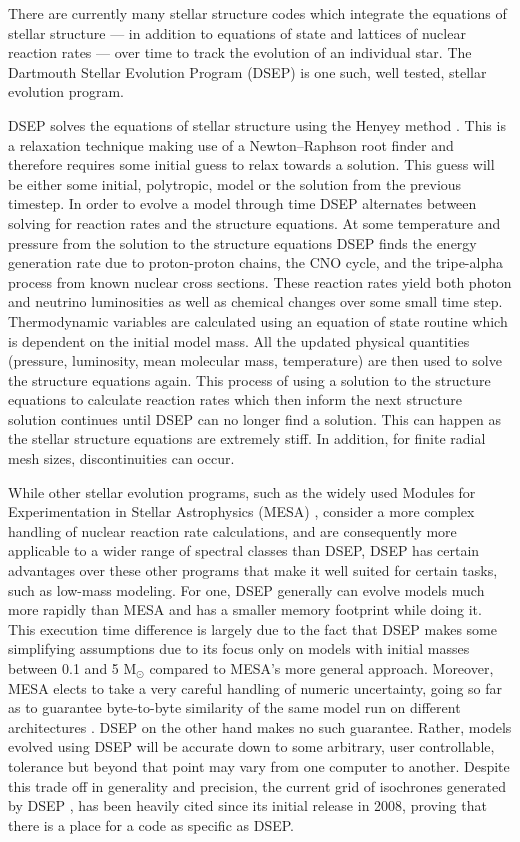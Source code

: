 There are currently many stellar structure codes \citep[e.g.][]{Dotter2008,
Kovetz2009, Paxton2011} which integrate the equations of stellar structure ---
in addition to equations of state and lattices of nuclear reaction rates ---
over time to track the evolution of an individual star. The Dartmouth Stellar
Evolution Program (DSEP) \citep{Chaboyer2001, Bjork2006, Dotter2008} is one
such, well tested, stellar evolution program.

DSEP solves the equations of stellar structure using the Henyey method
\citep{Henyey1964}. This is a relaxation technique making use of a
Newton–Raphson root finder and therefore requires some initial guess to relax
towards a solution. This guess will be either some initial, polytropic, model
or the solution from the previous timestep.  In order to evolve a model through
time DSEP alternates between solving for reaction rates and the structure
equations. At some temperature and pressure from the solution to the structure
equations DSEP finds the energy generation rate due to proton-proton chains,
the CNO cycle, and the tripe-alpha process from known nuclear cross sections.
These reaction rates yield both photon and neutrino luminosities as well as
chemical changes over some small time step. Thermodynamic variables are
calculated using an equation of state routine which is dependent on the initial
model mass. All the updated physical quantities (pressure, luminosity, mean
molecular mass, temperature) are then used to solve the structure equations
again. This process of using a solution to the structure equations to calculate
reaction rates which then inform the next structure solution continues until
DSEP can no longer find a solution.  This can happen as the stellar structure
equations are extremely stiff. In addition, for finite radial mesh sizes,
discontinuities can occur.

While other stellar evolution programs, such as the widely used Modules for
Experimentation in Stellar Astrophysics (MESA) \citep{Paxton2011}, consider a
more complex handling of nuclear reaction rate calculations, and are
consequently more applicable to a wider range of spectral classes than DSEP,
DSEP has certain advantages over these other programs that make it well suited
for certain tasks, such as low-mass modeling. For one, DSEP generally can
evolve models much more rapidly than MESA and has a smaller memory footprint
while doing it. This execution time difference is largely due to the fact that
DSEP makes some simplifying assumptions due to its focus only on models with
initial masses between 0.1 and 5 M$_{\odot}$ compared to MESA’s more general
approach.  Moreover, MESA elects to take a very careful handling of numeric
uncertainty, going so far as to guarantee byte-to-byte similarity of the same
model run on different architectures \citep{Paxton2011}. DSEP on the other hand
makes no such guarantee. Rather, models evolved using DSEP will be accurate
down to some arbitrary, user controllable, tolerance but beyond that point may
vary from one computer to another. Despite this trade off in generality and
precision, the current grid of isochrones generated by DSEP \citep{Dotter2008},
has been heavily cited since its initial release in 2008, proving that there is
a place for a code as specific as DSEP.

